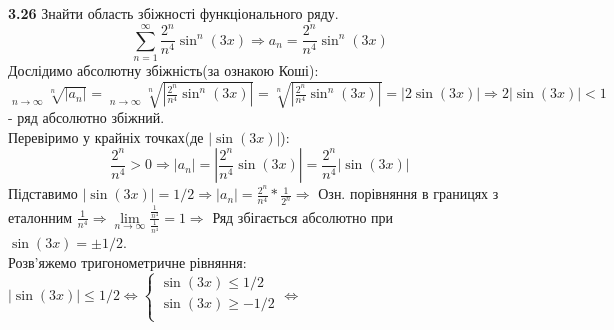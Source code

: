 \documentclass[14pt,a4paper]{scrartcl}
\theoremstyle{definition}
\theoremstyle{remark}
\theoremstyle{definition}
\theoremstyle{definition}
\DeclareMathOperator*\uplim{\overline{lim}}
\begin{document}
\pagebreak

\textbf{3.26} Знайти область збіжності функціонального ряду.\\

$$  \sum\limits_{n = 1}^{ \infty}{ \frac{2^n}{n^4} \sin^n{(3x)}  }  \Rightarrow a_n = \frac{2^n}{n^4}\sin^n{(3x)}  $$
Дослідимо абсолютну збіжність(за ознакою Коші): $  \uplim\limits_{n\to  \infty}{ \sqrt[n]{\left| a_n \right|} } =  \uplim\limits_{n\to  \infty}{  \sqrt[n]{ \left|\frac{2^n}{n^4}\sin^n{(3x)}    \right| }  } =  \sqrt[n]{ \left|\frac{2^n}{n^4}\sin^n{(3x)}    \right| }  =  \left| 2 \sin{(3x)}  \right| \Rightarrow 2 \left| \sin{(3x)}  \right| < 1 $ - ряд абсолютно збіжний.\\
Перевіримо у крайніх точках(де $ \left| \sin(3x) \right|  $):\\
$$\frac{2^n}{n^4} > 0 \Rightarrow \left| a_n \right| = \left| \frac{2^n}{n^4}\sin{(3x)}   \right| =  \frac{2^n}{n^4} \left| \sin{(3x)}  \right| $$
Підставимо
$ \left| \sin{(3x)}  \right| = 1/2 \Longrightarrow |a_n| = \frac{2^n}{n^4} * \frac{1}{2^n } \Longrightarrow $ Озн. порівняння в границях з еталонним $\frac{1}{n^4}   \Longrightarrow  \lim\limits_{n\to  \infty}{ \frac{ \frac{1}{n^4} }{  \frac{1}{n^4} } } = 1 \Rightarrow$ Ряд збігається абсолютно при $\sin{(3x)} = \pm 1/2 $. \\

Розв'яжемо тригонометричне рівняння: $ \left| \sin{(3x)}  \right| \leq 1/2  \Leftrightarrow  \left\lbrace \begin{gathered}
\sin{(3x)} \leq  1/2\\
\sin{(3x)} \geq -1/2\\
\end{gathered} \right. \Leftrightarrow $
\end{document}
